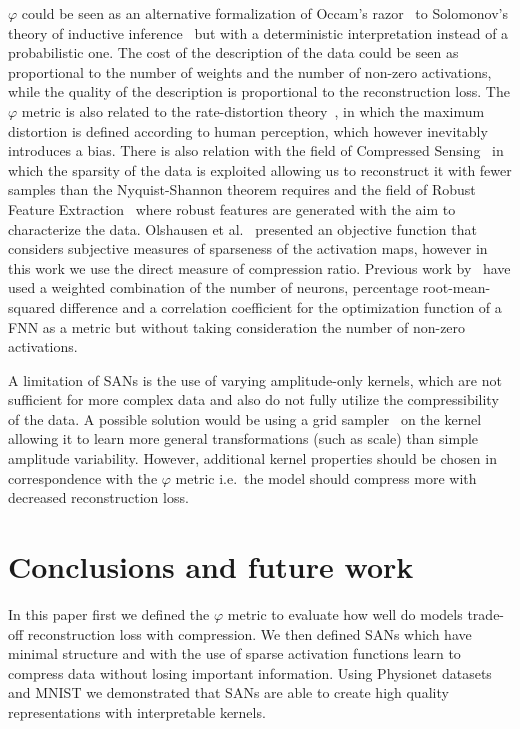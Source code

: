 \documentclass[journal]{IEEEtran}
\begin{document}
$\varphi$ could be seen as an alternative formalization of Occam's razor~\cite{soklakov2002occam} to Solomonov's theory of inductive inference~\cite{solomonoff1964formal} but with a deterministic interpretation instead of a probabilistic one.
The cost of the description of the data could be seen as proportional to the number of weights and the number of non-zero activations, while the quality of the description is proportional to the reconstruction loss.
The $\varphi$ metric is also related to the rate-distortion theory~\cite{burger1971rate}, in which the maximum distortion is defined according to human perception, which however inevitably introduces a bias.
There is also relation with the field of Compressed Sensing~\cite{donoho2006compressed} in which the sparsity of the data is exploited allowing us to reconstruct it with fewer samples than the Nyquist-Shannon theorem requires and the field of Robust Feature Extraction~\cite{kim2013deep} where robust features are generated with the aim to characterize the data.
Olshausen et al.~\cite{olshausen1996emergence} presented an objective function that considers subjective measures of sparseness of the activation maps, however in this work we use the direct measure of compression ratio.
Previous work by~\cite{zhang2017ecg} have used a weighted combination of the number of neurons, percentage root-mean-squared difference and a correlation coefficient for the optimization function of a FNN as a metric but without taking consideration the number of non-zero activations.

A limitation of SANs is the use of varying amplitude-only kernels, which are not sufficient for more complex data and also do not fully utilize the compressibility of the data.
A possible solution would be using a grid sampler~\cite{jaderberg2015spatial} on the kernel allowing it to learn more general transformations (such as scale) than simple amplitude variability.
However, additional kernel properties should be chosen in correspondence with the $\varphi$ metric i.e.\ the model should compress more with decreased reconstruction loss.

\section{Conclusions and future work}\label{sec:conclusions}
In this paper first we defined the $\varphi$ metric to evaluate how well do models trade-off reconstruction loss with compression.
We then defined SANs which have minimal structure and with the use of sparse activation functions learn to compress data without losing important information.
Using Physionet datasets and MNIST we demonstrated that SANs are able to create high quality representations with interpretable kernels.
\end{document}
